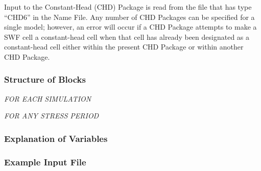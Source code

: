 
Input to the Constant-Head (CHD) Package is read from the file that has type ``CHD6'' in the Name File.  Any number of CHD Packages can be specified for a single model; however, an error will occur if a CHD Package attempts to make a SWF cell a constant-head cell when that cell has already been designated as a constant-head cell either within the present CHD Package or within another CHD Package.

\vspace{5mm}
\subsubsection{Structure of Blocks}
\vspace{5mm}

\noindent \textit{FOR EACH SIMULATION}


\vspace{5mm}
\noindent \textit{FOR ANY STRESS PERIOD}

\packageperioddescription

\vspace{5mm}
\subsubsection{Explanation of Variables}
\begin{description}

\end{description}

\vspace{5mm}
\subsubsection{Example Input File}




